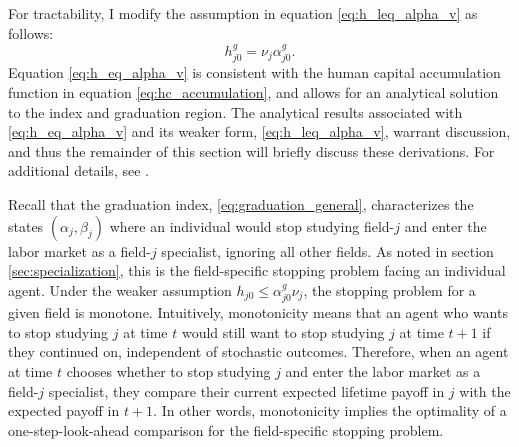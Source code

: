 \documentclass[11 pt]{article}
\begin{document}
For tractability, I modify the assumption in equation \eqref{eq:h_leq_alpha_v} as follows:
\begin{equation}\label{eq:h_eq_alpha_v}
    h_{j0}^g = \nu_j \alpha_{j0}^g.
\end{equation}
Equation \eqref{eq:h_eq_alpha_v} is consistent with the human capital accumulation function in equation \eqref{eq:hc_accumulation}, and allows for an analytical solution to the index and graduation region.
The analytical results associated with \eqref{eq:h_eq_alpha_v} and its weaker form, \eqref{eq:h_leq_alpha_v}, warrant discussion, and thus the remainder of this section will briefly discuss these derivations.
For additional details, see \textcite{AF20}.

Recall that the graduation index, \eqref{eq:graduation_general}, characterizes the states $(\alpha_{j}, \beta_{j})$ where an individual would stop studying field-$j$ and enter the labor market as a field-$j$ specialist, ignoring all other fields.
As noted in section \ref{sec:specialization}, this is the field-specific stopping problem facing an individual agent.
Under the weaker assumption $h_{j0} \leq \alpha_{j0}^g \nu_j$, the stopping problem for a given field is monotone.
Intuitively, monotonicity means that an agent who wants to stop studying $j$ at time $t$ would still want to stop studying $j$ at time $t+1$ if they continued on, independent of stochastic outcomes.
Therefore, when an agent at time $t$ chooses whether to stop studying $j$ and enter the labor market as a field-$j$ specialist, they compare their current expected lifetime payoff in $j$ with the expected payoff in $t+1$.
In other words, monotonicity implies the optimality of a one-step-look-ahead comparison for the field-specific stopping problem.
\end{document}
